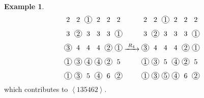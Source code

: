 \documentclass[submission]{FPSAC2018}
\newcommand{\swt}[1]{\left\langle #1 \right\rangle} %
\theoremstyle{plain}
\theoremstyle{definition}
\newtheorem{example}[thm]{Example}
\numberwithin{equation}{section}
\begin{document}
\begin{example}
\[\begin{tikzpicture}[xscale=0.5,yscale=0.7,every node/.style={inner sep=0.8pt},baseline=55]
\node at (0, 5){2};\node at (1, 5){2};\node[circle, draw=black] at (2, 5){1};\node at (3, 5){2};\node at (4, 5){2};\node at (5, 5){2};\node at (0, 4){3};\node[circle, draw=black] at (1, 4){2};\node at (2, 4){3};\node at (3, 4){3};\node at (4, 4){3};\node[circle, draw=black] at (5, 4){1};\node[circle, draw=black] at (0, 3){3};\node at (1, 3){4};\node at (2, 3){4};\node at (3, 3){4};\node[circle, draw=black] at (4, 3){2};\node[circle, draw=black] at (5, 3){1};\node[circle, draw=black] at (0, 2){1};\node[circle, draw=black] at (1, 2){3};\node[circle, draw=black] at (2, 2){4};\node[circle, draw=black] at (3, 2){4};\node[circle, draw=black] at (4, 2){2};\node at (5, 2){5};\node[circle, draw=black] at (0, 1){1};\node[circle, draw=black] at (1, 1){3};\node at (2, 1){5};\node[circle, draw=black] at (3, 1){4};\node at (4, 1){6};\node[circle, draw=black] at (5, 1){2};\end{tikzpicture}
\xrightarrow[\hspace{15pt}]{R_4}
\begin{tikzpicture}[xscale=0.5,yscale=0.7,every node/.style={inner sep=0.8pt},baseline=55]
\node at (0, 5){2};\node at (1, 5){2};\node[circle, draw=black] at (2, 5){1};\node at (3, 5){2};\node at (4, 5){2};\node at (5, 5){2};\node at (0, 4){3};\node[circle, draw=black] at (1, 4){2};\node at (2, 4){3};\node at (3, 4){3};\node at (4, 4){3};\node[circle, draw=black] at (5, 4){1};\node[circle, draw=black] at (0, 3){3};\node at (1, 3){4};\node at (2, 3){4};\node at (3, 3){4};\node[circle, draw=black] at (4, 3){2};\node[circle, draw=black] at (5, 3){1};\node[circle, draw=black] at (0, 2){1};\node[circle, draw=black] at (1, 2){3};\node at (2, 2){5};\node[circle, draw=black] at (3, 2){4};\node[circle, draw=black] at (4, 2){2};\node at (5, 2){5};\node[circle, draw=black] at (0, 1){1};\node[circle, draw=black] at (1, 1){3};\node[circle, draw=black] at (2, 1){5};\node[circle, draw=black] at (3, 1){4};\node at (4, 1){6};\node[circle, draw=black] at (5, 1){2};
\end{tikzpicture}
\]
which contributes to $\swt{135462}$.
\end{example}
\end{document}
